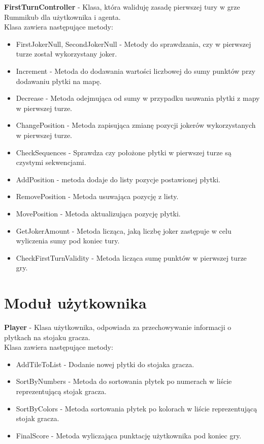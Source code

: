 \documentclass[a4paper,twoside,12pt]{book}
\begin{document}
	
	\textbf{FirstTurnController} - Klasa, która waliduję zasadę pierwszej tury w grze Rummikub dla użytkownika i agenta.\\ Klasa zawiera następujące metody:
			\begin{itemize}
				\item FirstJokerNull, SecondJokerNull - Metody do sprawdzania, czy w pierwszej turze został wykorzystany joker.
				\item Increment - Metoda do dodawania wartości liczbowej do sumy punktów przy dodawaniu płytki na mapę.
				\item Decrease - Metoda odejmująca od sumy w przypadku usuwania płytki z mapy w pierwszej turze.
				\item ChangePosition - Metoda zapisująca zmianę pozycji jokerów wykorzystanych w pierwszej turze.
				\item CheckSequences - Sprawdza czy położone płytki w pierwszej turze są czystymi sekwencjami.
				\item AddPosition - metoda dodaje do listy pozycje postawionej płytki.
				\item RemovePosition - Metoda usuwająca pozycję z listy.
				\item MovePosition - Metoda aktualizująca pozycję płytki.
				\item GetJokerAmount - Metoda licząca, jaką liczbę joker zastępuje w celu wyliczenia sumy pod koniec tury.
				\item CheckFirstTurnValidity - Metoda licząca sumę punktów w pierwszej turze gry.
			\end{itemize}
	
	\section{Moduł użytkownika}
		\textbf{Player} - Klasa użytkownika, odpowiada za przechowywanie informacji o płytkach na stojaku gracza.\\ Klasa zawiera następujące metody:
		\begin{itemize}
			\item AddTileToList - Dodanie nowej płytki do stojaka gracza.
			\item SortByNumbers - Metoda do sortowania płytek po numerach w liście reprezentującą stojak gracza.
			\item SortByColors - Metoda sortowania płytek po kolorach w liście reprezentującą stojak gracza.
			\item FinalScore - Metoda wyliczająca punktację użytkownika pod koniec gry.
		\end{itemize}
\end{document}
